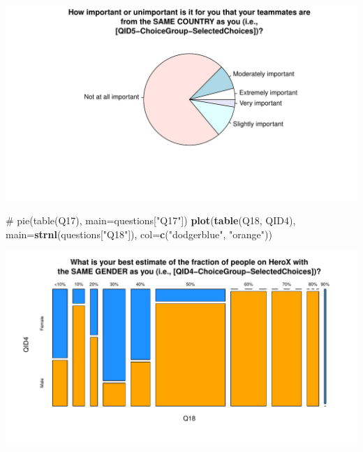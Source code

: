 \documentclass[12pt, titlepage]{article}
\newenvironment{Shaded}{\begin{snugshade}}{\end{snugshade}}
\newcommand{\KeywordTok}[1]{\textcolor[rgb]{0.12,0.11,0.11}{\textbf{#1}}}
\newcommand{\DataTypeTok}[1]{\textcolor[rgb]{0.00,0.34,0.68}{#1}}
\newcommand{\DecValTok}[1]{\textcolor[rgb]{0.69,0.50,0.00}{#1}}
\newcommand{\StringTok}[1]{\textcolor[rgb]{0.75,0.01,0.01}{#1}}
\newcommand{\CommentTok}[1]{\textcolor[rgb]{0.54,0.53,0.53}{#1}}
\newcommand{\ControlFlowTok}[1]{\textcolor[rgb]{0.12,0.11,0.11}{\textbf{#1}}}
\newcommand{\OperatorTok}[1]{\textcolor[rgb]{0.12,0.11,0.11}{#1}}
\newcommand{\NormalTok}[1]{\textcolor[rgb]{0.12,0.11,0.11}{#1}}
\begin{document}
\includegraphics{report_survey_files/figure-latex/unnamed-chunk-2-12.pdf}

\begin{Shaded}
\begin{Highlighting}[]
\CommentTok{# pie(table(Q17), main=questions["Q17"])}
\KeywordTok{plot}\NormalTok{(}\KeywordTok{table}\NormalTok{(Q18, QID4), }\DataTypeTok{main=}\KeywordTok{strnl}\NormalTok{(questions[}\StringTok{"Q18"}\NormalTok{]), }\DataTypeTok{col=}\KeywordTok{c}\NormalTok{(}\StringTok{"dodgerblue"}\NormalTok{, }\StringTok{"orange"}\NormalTok{))}
\end{Highlighting}
\end{Shaded}

\includegraphics{report_survey_files/figure-latex/unnamed-chunk-2-13.pdf}

\begin{Shaded}
\end{Shaded}
\end{document}
